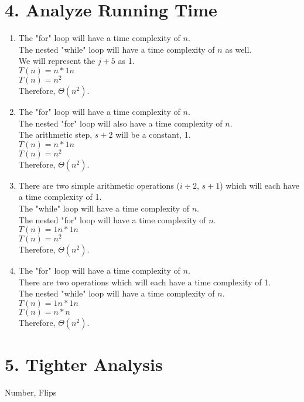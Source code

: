 \documentclass[11pt]{article}
\newenvironment{qparts}{\begin{enumerate}[{(}a{)}]}{\end{enumerate}}
\begin{document}
\section*{4. Analyze Running Time}
\begin{qparts}
\item
The "for" loop will have a time complexity of $n$.\\
The nested "while" loop will have a time complexity of $n$ as well. \\
We will represent the $j + 5$ as 1.\\
$T(n) = n * 1n$ \\
$T(n) = n^2$ \\
Therefore, $\Theta (n^2)$.


\item 
The "for" loop will have a time complexity of $n$. \\
The nested "for" loop will also have a time complexity of $n$. \\
The arithmetic step, $s + 2$ will be a constant, 1. \\
$T(n) = n * 1n$ \\
$T(n) = n^2$ \\
Therefore, $\Theta (n^2)$.


\item 
There are two simple arithmetic operations ($i \div 2$, $s + 1$) which will each have a time complexity of 1. \\
The "while" loop will have a time complexity of $n$.\\
The nested "for" loop will have a time complexity of $n$.\\
$T(n) = 1n * 1n$\\
$T(n) = n^2$\\
Therefore, $\Theta (n^2)$.


\item
The "for" loop will have a time complexity of $n$. \\
There are two operations which will each have a time complexity of 1. \\
The nested "while" loop will have a time complexity of $n$.\\
$T(n) = 1n * 1n$\\
$T(n) = n * n$\\
Therefore, $\Theta (n^2)$.

\end{qparts}





\newpage
\section*{5. Tighter Analysis}
Number, Flips
\end{document}
